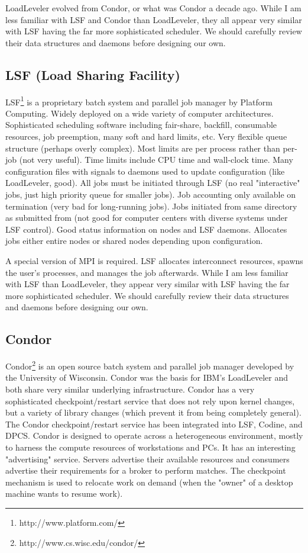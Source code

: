 LoadLeveler evolved from Condor, or what was Condor a decade ago. 
While I am less familiar with LSF and Condor than LoadLeveler, they 
all appear very similar with LSF having the far more sophisticated 
scheduler. We should carefully review their data structures and 
daemons before designing our own.

\subsection{LSF (Load Sharing Facility)}


LSF\footnote{http://www.platform.com/}
 is a proprietary batch system and parallel job manager by 
Platform Computing. Widely deployed on a wide variety of computer 
architectures. Sophisticated scheduling software including 
fair-share, backfill, consumable resources, job preemption, many soft 
and hard limits, etc. Very flexible queue structure (perhaps overly 
complex). Most limits are per process rather than per-job (not very 
useful). Time limits include CPU time and wall-clock time. Many 
configuration files with signals to daemons used to update 
configuration (like LoadLeveler, good). All jobs must be initiated 
through LSF (no real "interactive" jobs, just high priority queue for 
smaller jobs). Job accounting only available on termination (very bad 
for long-running jobs). Jobs initiated from same directory as 
submitted from (not good for computer centers with diverse systems 
under LSF control). Good status information on nodes and LSF daemons. 
Allocates jobs either entire nodes or shared nodes depending upon 
configuration.

A special version of MPI is required. LSF allocates interconnect 
resources, spawns the user's processes, and manages the job 
afterwards. While I am less familiar with LSF than LoadLeveler, they 
appear very similar with LSF having the far more sophisticated 
scheduler. We should carefully review their data structures and 
daemons before designing our own.


\subsection{Condor}


Condor\footnote{http://www.cs.wisc.edu/condor/}
 is an open source batch system and parallel job manager 
developed by the University of Wisconsin. Condor was the basis for 
IBM's LoadLeveler and both share very similar underlying 
infrastructure. Condor has a very sophisticated checkpoint/restart 
service that does not rely upon kernel changes, but a variety of 
library changes (which prevent it from being completely general). The 
Condor checkpoint/restart service has been integrated into LSF, 
Codine, and DPCS. Condor is designed to operate across a 
heterogeneous environment, mostly to harness the compute resources of 
workstations and PCs. It has an interesting "advertising" service. 
Servers advertise their available resources and consumers advertise 
their requirements for a broker to perform matches. The checkpoint 
mechanism is used to relocate work on demand (when the "owner" of a 
desktop machine wants to resume work).



